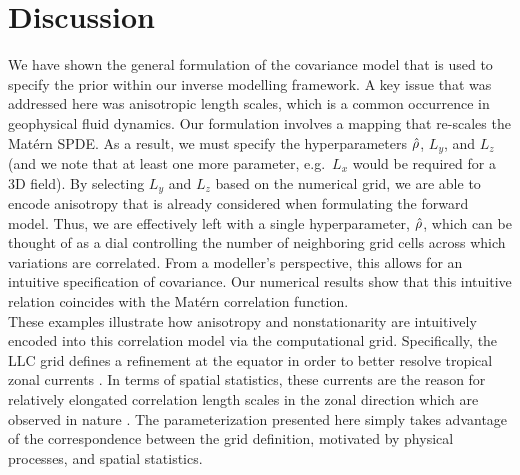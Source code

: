 \section{Discussion}
\label{sec:matern_discussion}

We have shown the general formulation of the covariance model that is used
to specify the prior within our inverse modelling framework.
A key issue that was addressed here was anisotropic length scales, which is a
common occurrence in geophysical fluid dynamics.
Our formulation involves a mapping that re-scales the Mat\'ern SPDE.
As a result, we must specify the hyperparameters $\hat{\rho}$, $L_y$, and $L_z$
(and we note that at least one more parameter, e.g.\ $L_x$ would be required for
a 3D field).
By selecting $L_y$ and $L_z$ based on the numerical grid, we are able to encode
anisotropy that is already considered when formulating the forward model.
Thus, we are effectively left with a single hyperparameter, $\hat{\rho}$, which can
be thought of as a dial controlling the number of neighboring grid cells across
which variations are correlated.
From a modeller's perspective, this allows for an intuitive specification of
covariance.
Our numerical results show that this intuitive relation coincides with the
Mat\'ern correlation function. \\

These examples illustrate how anisotropy and nonstationarity are intuitively
encoded into this correlation model via the computational grid.
Specifically, the LLC grid defines a refinement at the equator in order to
better resolve tropical zonal currents \cite{forgetECCOv4} .
In terms of spatial statistics, these currents are the reason for
relatively elongated correlation length scales in the zonal direction which are
observed in nature .
The parameterization presented here simply takes advantage of the correspondence
between the grid definition, motivated by physical processes, and spatial
statistics.

